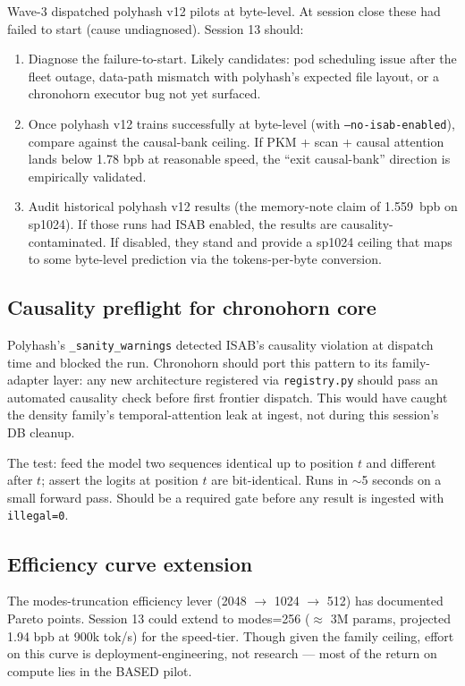 Wave-3 dispatched polyhash v12 pilots at byte-level. At session close these had failed to start (cause undiagnosed). Session 13 should:
\begin{enumerate}
  \item Diagnose the failure-to-start. Likely candidates: pod scheduling issue after the fleet outage, data-path mismatch with polyhash's expected file layout, or a chronohorn executor bug not yet surfaced.
  \item Once polyhash v12 trains successfully at byte-level (with \texttt{--no-isab-enabled}), compare against the causal-bank ceiling. If PKM + scan + causal attention lands below 1.78 bpb at reasonable speed, the ``exit causal-bank'' direction is empirically validated.
  \item Audit historical polyhash v12 results (the memory-note claim of 1.559~bpb on sp1024). If those runs had ISAB enabled, the results are causality-contaminated. If disabled, they stand and provide a sp1024 ceiling that maps to some byte-level prediction via the tokens-per-byte conversion.
\end{enumerate}

\subsection{Causality preflight for chronohorn core}

Polyhash's \texttt{\_sanity\_warnings} detected ISAB's causality violation at dispatch time and blocked the run. Chronohorn should port this pattern to its family-adapter layer: any new architecture registered via \texttt{registry.py} should pass an automated causality check before first frontier dispatch. This would have caught the density family's temporal-attention leak at ingest, not during this session's DB cleanup.

The test: feed the model two sequences identical up to position $t$ and different after $t$; assert the logits at position $t$ are bit-identical. Runs in $\sim$5 seconds on a small forward pass. Should be a required gate before any result is ingested with \texttt{illegal=0}.

\subsection{Efficiency curve extension}

The modes-truncation efficiency lever (2048 $\to$ 1024 $\to$ 512) has documented Pareto points. Session 13 could extend to modes=256 ($\approx$ 3M params, projected 1.94 bpb at 900k tok/s) for the speed-tier. Though given the family ceiling, effort on this curve is deployment-engineering, not research --- most of the return on compute lies in the BASED pilot.

